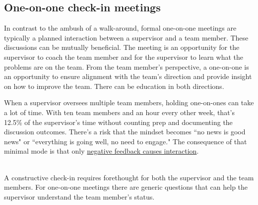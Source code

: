 \subsection*{One-on-one check-in meetings\label{sec:meetings-one-on-one}}





In contrast to the ambush of a walk-around, formal one-on-one meetings are typically a planned interaction between a supervisor and a team member. These discussions can be mutually beneficial. The meeting is an opportunity for the supervisor to coach the team member and for the supervisor to learn what the problems are on the team. From the team member's perspective, a one-on-one is an opportunity to ensure alignment with the team's direction and provide insight on how to improve the team. There can be education in both directions. 

When a supervisor oversees multiple team members, holding one-on-ones can take a lot of time. With ten team members and an hour every other week, that's 12.5\% of the supervisor's time without counting prep and documenting the discussion outcomes.  There's a risk that the mindset becomes ``no news is good news" or ``everything is going well, no need to engage." The consequence of that minimal mode is that only 
\href{https://en.wikipedia.org/wiki/Seagull_management}{negative feedback causes interaction}. 
\iftoggle{WPinmargin}{\marginpar{$>$Wikipedia: Seagull management}}{}%

\ \\


A constructive check-in requires forethought for both the supervisor and the team members. For one-on-one meetings there are generic questions that can help the supervisor understand the team member's status. 

